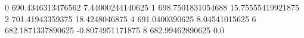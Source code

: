 0 690.4346313476562 7.44000244140625
1 698.7501831054688 15.75555419921875
2 701.41943359375 18.4248046875
4 691.0400390625 8.04541015625
6 682.1871337890625 -0.8074951171875
8 682.99462890625 0.0
